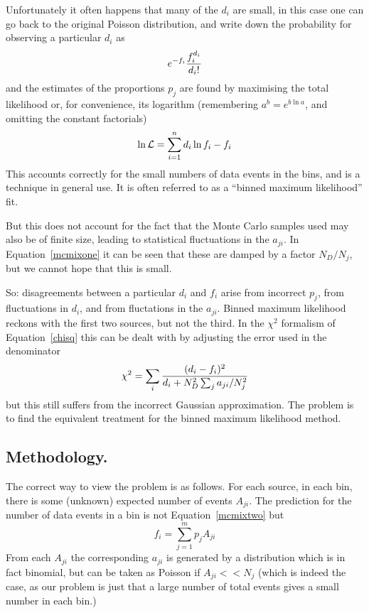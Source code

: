 Unfortunately it often happens that many of the $d_i$ are small, in this
case one can go back to the original Poisson distribution, and write down
the probability for observing a particular $d_i$ as
\begin{equation}
e^{-f_i} {f_i^{d_i}\over d_i!} \label{poisson}
\end{equation}
and the estimates of the proportions
$p_j$ are found by maximising the
total likelihood or, for convenience, its logarithm
(remembering $a^b = e^{b \ln a}$, and omitting the constant factorials)
\begin{equation}
\ln {\cal L} = \sum_{i=1}^n d_i \ln f_i - f_i \label{mlone}
\end{equation}
This accounts correctly for the small numbers of data events in the bins,
and is a technique in general use.  It is often referred to
as a ``binned maximum likelihood'' fit.
 
But this does not account for the fact that the Monte Carlo
samples used may also be of finite size, leading to
statistical fluctuations in the $a_{ji}$.
In Equation~\ref{mcmixone} it can be seen that these are damped
by a factor $N_D/N_j$, but we cannot hope that this is small.
 
So: disagreements between a particular $d_i$ and $f_i$
arise from incorrect $p_j$, from fluctuations
in $d_i$, and from fluctations in the $a_{ji}$.
Binned maximum likelihood
reckons with the first two sources, but not the third.
In the $\chi^2$ formalism of Equation~\ref{chisq} this can be dealt with
by adjusting the error used in the denominator
\begin{equation}
\chi^2 = \sum_i {(d_i-f_i)^2 \over
d_i + N_D^2 \sum_j a_{ji}/N_j^2}
\label{chisqb}
\end{equation}
but this still suffers from the incorrect Gaussian approximation.
The problem is to find the equivalent treatment for the
binned maximum likelihood method.
 
\subsection*{Methodology.}
 
The correct way to view the problem is as follows.  For each source,
in each bin, there is some (unknown) expected number of events $A_{ji}$.
The prediction for the number of data events in a bin is
not Equation~\ref{mcmixtwo} but
\begin{equation}
f_i = \sum_{j=1}^m p_j A_{ji} \label{mcmixthree}
\end{equation}
From each $A_{ji}$ the corresponding $a_{ji}$ is generated
by a distribution which is in fact binomial, but can be taken as
Poisson if $A_{ji}<<N_j$ (which is indeed the case,
as our problem is just that a large number of total events gives
a small number in each bin.)
 
